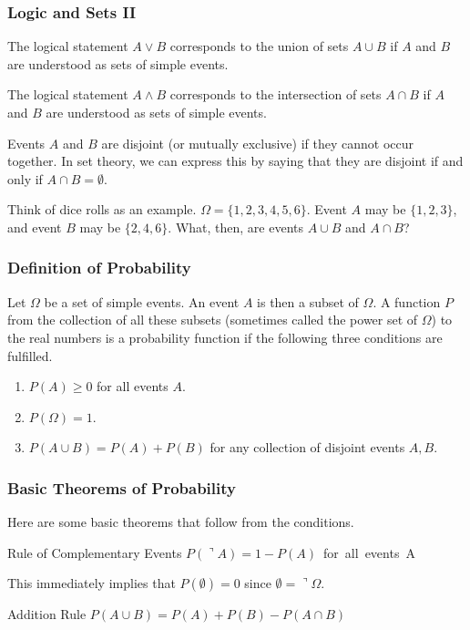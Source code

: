 \documentclass[xcolor=dvipsnames]{beamer}
\begin{document}
\begin{frame}
  \frametitle{Logic and Sets II}
  The logical statement $A\vee{}B$ corresponds to the union of sets
  $A\cup{}B$ if $A$ and $B$ are understood as sets of simple events.

\medskip

  The logical statement $A\wedge{}B$ corresponds to the intersection of sets
  $A\cap{}B$ if $A$ and $B$ are understood as sets of simple events.

\medskip

Events $A$ and $B$ are \alert{disjoint} (or \alert{mutually
  exclusive}) if they cannot occur together. In set theory, we can
express this by saying that they are disjoint if and only if
$A\cap{}B=\emptyset$.

Think of dice rolls as an example. $\Omega=\{1,2,3,4,5,6\}$. Event $A$
may be $\{1,2,3\}$, and event $B$ may be $\{2,4,6\}$. What, then, are
events $A\cup{}B$ and $A\cap{}B$?
\end{frame}

\begin{frame}
  \frametitle{Definition of Probability}
Let $\Omega$ be a set of simple events. An event $A$ is then a subset
of $\Omega$. A function $P$ from the collection of all these subsets
(sometimes called the power set of $\Omega$) to the real numbers is a
\alert{probability function} if the following three conditions are
fulfilled.
\begin{enumerate}
\item<1-> $P(A)\geq{}0$ for all events $A$.
\item<2-> $P(\Omega)=1$.
\item<3->
  $P(A\cup{}B)=P(A)+P(B)$
  for any collection of disjoint events $A,B$.
\end{enumerate}
\end{frame}

\begin{frame}
  \frametitle{Basic Theorems of Probability}
Here are some basic theorems that follow from the conditions.
\begin{block}{Rule of Complementary Events}
  $P(\urcorner{}A)=1-P(A)$\mbox{ for all events }A
\end{block}
This immediately implies that $P(\emptyset)=0$ since
$\emptyset=\urcorner\Omega$.
\begin{block}{Addition Rule}
  $P(A\cup{}B)=P(A)+P(B)-P(A\cap{}B)$
\end{block}
\end{frame}
\end{document}
